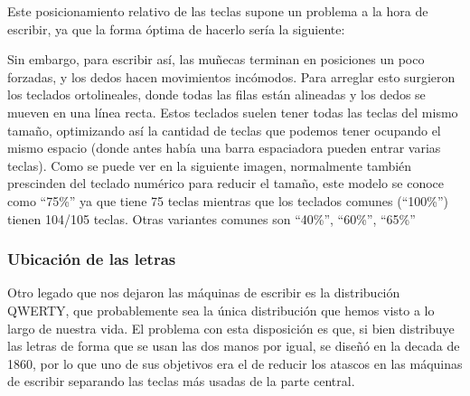     Este posicionamiento relativo de las teclas supone un problema a la hora de escribir, ya que la forma óptima de hacerlo sería la siguiente:
  
    Sin embargo, para escribir así, las muñecas terminan en posiciones un poco forzadas, y los dedos hacen movimientos incómodos. Para arreglar esto surgieron los teclados ortolineales, donde todas las filas están alineadas y los dedos se mueven en una línea recta. Estos teclados suelen tener todas las teclas del mismo tamaño, optimizando así la cantidad de teclas que podemos tener ocupando el mismo espacio (donde antes había una barra espaciadora pueden entrar varias teclas). Como se puede ver en la siguiente imagen, normalmente también prescinden del teclado numérico para reducir el tamaño, este modelo se conoce como ``75\%'' ya que tiene 75 teclas mientras que los teclados comunes (``100\%'') tienen 104/105 teclas. Otras variantes comunes son ``40\%'', ``60\%'', ``65\%'' 

    \subsubsection{Ubicación de las letras}
    Otro legado que nos dejaron las máquinas de escribir es la distribución QWERTY, que probablemente sea la única distribución que hemos visto a lo largo de nuestra vida. El problema con esta disposición es que, si bien distribuye las letras de forma que se usan las dos manos por igual, se diseñó en la decada de 1860, por lo que uno de sus objetivos era el de reducir los atascos en las máquinas de escribir separando las teclas más usadas de la parte central. 

